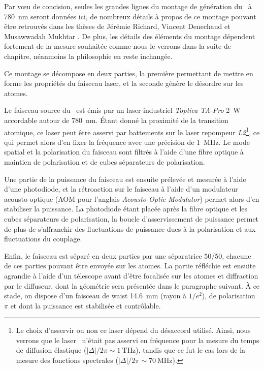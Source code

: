 Par vœu de concision, seules les grandes lignes du montage de génération du \speckle\ à \SI{780}{\nano\metre} seront données ici, de nombreux détails à propos de ce montage pouvant être retrouvés dans les thèses de Jérémie Richard, Vincent Denechaud et Musawwadah Mukhtar \citep{denechaud2018vers, mukhtar2019state, richard2015propagation}. De plus, les détails des éléments du montage dépendent fortement de la mesure souhaitée comme nous le verrons dans la suite de chapitre, néanmoins la philosophie en reste inchangée.

Ce montage se décompose en deux parties, la première permettant de mettre en forme les propriétés du faisceau laser, et la seconde génère le désordre sur les atomes.

Le faisceau source du \speckle\ est émis par un laser industriel \emph{Toptica TA-Pro} \SI{2}{\watt} accordable autour de \SI{780}{\nano\metre}. Étant donné la proximité de la transition atomique, ce laser peut être asservi par battements sur le laser repompeur \emph{L2}\footnote{Le choix d'asservir ou non ce laser dépend du désaccord utilisé. Ainsi, nous verrons que le laser \speckle\ n'était pas asservi en fréquence pour la mesure du temps de diffusion élastique ($\left|\Delta\right|/2\pi\sim\SI{1}{\tera\hertz}$), tandis que ce fut le cas lors de la mesure des fonctions spectrales ($\left|\Delta\right|/2\pi\sim\SI{70}{\mega\hertz}$).}, ce qui permet alors d'en fixer la fréquence avec une précision de \SI{1}{\mega\hertz}. Le mode spatial et la polarisation du faisceau sont filtrés à l'aide d'une fibre optique à maintien de polarisation et de cubes séparateurs de polarisation. 

Une partie de la puissance du faisceau est ensuite prélevée et mesurée à l'aide d'une photodiode, et la rétroaction sur le faisceau à l'aide d'un modulateur acousto-optique (AOM pour l'anglais \emph{Acousto-Optic Modulator}) permet alors d'en stabiliser la puissance. La photodiode étant placée après la fibre optique et les cubes séparateurs de polarisation, la boucle d'asservissement de puissance permet de plus de s'affranchir des fluctuations de puissance dues à la polarisation et aux fluctuations du couplage. 

Enfin, le faisceau est séparé en deux parties par une séparatrice $50/50$, chacune de ces parties pouvant être envoyée sur les atomes. La partie réfléchie est ensuite agrandie à l'aide d'un télescope avant d'être focalisée sur les atomes et diffraction par le diffuseur, dont la géométrie sera présentée dans le paragraphe suivant. À ce stade, on dispose d'un faisceau de waist \SI{14.6}{\milli\metre} (rayon à $1/e^2$), de polarisation $\pi$ et dont la puissance est stabilisée et contrôlable.

